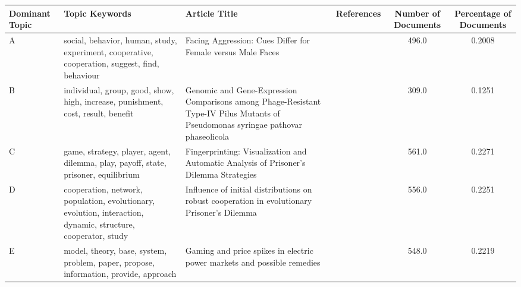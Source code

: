 \begin{tabularx}{1.9\textwidth}{lXXl|cc}
\toprule
Dominant Topic &                                                                                                 Topic Keywords &                                                                                                                                    Article Title &          References &  Number of Documents &  Percentage of Documents \\
\midrule
A &                 social, behavior, human, study, experiment, cooperative, cooperation, suggest, find, behaviour &                                                                                      Facing Aggression: Cues Differ for Female versus Male Faces &  \cite{Geniole2012} &                496.0 &                   0.2008 \\
B &                               individual, group, good, show, high, increase, punishment, cost, result, benefit &  Genomic and Gene-Expression Comparisons among Phage-Resistant Type-IV Pilus Mutants of Pseudomonas syringae pathovar phaseolicola &  \cite{Sistrom2015} &                309.0 &                   0.1251 \\
C &                             game, strategy, player, agent, dilemma, play, payoff, state, prisoner, equilibrium &                                                            Fingerprinting: Visualization and Automatic Analysis of Prisoner's Dilemma Strategies &  \cite{Sistrom2015} &                561.0 &                   0.2271 \\
D &  cooperation, network, population, evolutionary, evolution, interaction, dynamic, structure, cooperator, study &                                                   Influence of initial distributions on robust cooperation in evolutionary  Prisoner's Dilemma &     \cite{Chen2007} &                556.0 &                   0.2251 \\
E &                           model, theory, base, system, problem, paper, propose, information, provide, approach &                                                                          Gaming and price spikes in electric power markets and possible remedies &     \cite{Guan2002} &                548.0 &                   0.2219 \\
\bottomrule
\end{tabularx}
